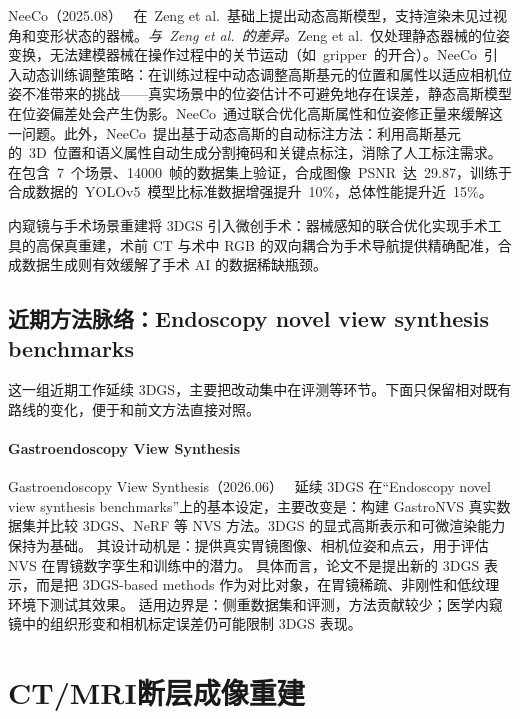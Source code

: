 NeeCo（2025.08）~\cite{2508_07897} 在~Zeng et al.~基础上提出动态高斯模型，支持渲染未见过视角和变形状态的器械。\textit{与~Zeng et al.~的差异。}Zeng et al.~仅处理静态器械的位姿变换，无法建模器械在操作过程中的关节运动（如~gripper~的开合）。NeeCo~引入动态训练调整策略：在训练过程中动态调整高斯基元的位置和属性以适应相机位姿不准带来的挑战——真实场景中的位姿估计不可避免地存在误差，静态高斯模型在位姿偏差处会产生伪影。NeeCo~通过联合优化高斯属性和位姿修正量来缓解这一问题。此外，NeeCo~提出基于动态高斯的自动标注方法：利用高斯基元的~3D~位置和语义属性自动生成分割掩码和关键点标注，消除了人工标注需求。在包含~7~个场景、14000~帧的数据集上验证，合成图像~PSNR~达~29.87，训练于合成数据的~YOLOv5~模型比标准数据增强提升~10\%，总体性能提升近~15\%。

\begin{takeaway}
内窥镜与手术场景重建将 3DGS 引入微创手术：器械感知的联合优化实现手术工具的高保真重建，术前 CT 与术中 RGB 的双向耦合为手术导航提供精确配准，合成数据生成则有效缓解了手术 AI 的数据稀缺瓶颈。
\end{takeaway}


\subsection{近期方法脉络：Endoscopy novel view synthesis benchmarks}

这一组近期工作延续 3DGS，主要把改动集中在评测等环节。下面只保留相对既有路线的变化，便于和前文方法直接对照。

\paragraph{Gastroendoscopy View Synthesis}
Gastroendoscopy View Synthesis（2026.06）~\cite{2606_25427} 延续 3DGS 在“Endoscopy novel view synthesis benchmarks”上的基本设定，主要改变是：构建 GastroNVS 真实数据集并比较 3DGS、NeRF 等 NVS 方法。3DGS 的显式高斯表示和可微渲染能力保持为基础。
其设计动机是：提供真实胃镜图像、相机位姿和点云，用于评估 NVS 在胃镜数字孪生和训练中的潜力。
具体而言，论文不是提出新的 3DGS 表示，而是把 3DGS-based methods 作为对比对象，在胃镜稀疏、非刚性和低纹理环境下测试其效果。
适用边界是：侧重数据集和评测，方法贡献较少；医学内窥镜中的组织形变和相机标定误差仍可能限制 3DGS 表现。
\section{CT/MRI断层成像重建}
\label{sec:19_2}

